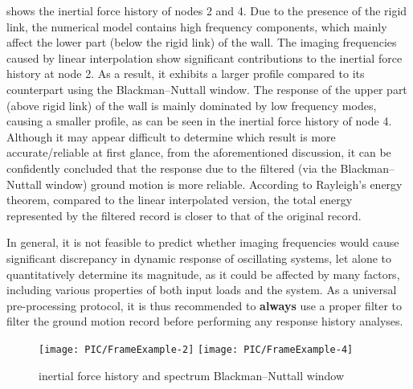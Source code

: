  shows the inertial force history of nodes 2 and 4. Due to the presence of the rigid link, the numerical model contains high frequency components, which mainly affect the lower part (below the rigid link) of the wall. The imaging frequencies caused by linear interpolation show significant contributions to the inertial force history at node 2. As a result, it exhibits a larger profile compared to its counterpart using the Blackman--Nuttall window. The response of the upper part (above rigid link) of the wall is mainly dominated by low frequency modes, causing a smaller profile, as can be seen in the inertial force history of node 4. Although it may appear difficult to determine which result is more accurate/reliable at first glance, from the aforementioned discussion, it can be confidently concluded that the response due to the filtered (via the Blackman--Nuttall window) ground motion is more reliable. According to Rayleigh’s energy theorem, compared to the linear interpolated version, the total energy represented by the filtered record is closer to that of the original record.

In general, it is not feasible to predict whether imaging frequencies would cause significant discrepancy in dynamic response of oscillating systems, let alone to quantitatively determine its magnitude, as it could be affected by many factors, including various properties of both input loads and the system. As a universal pre-processing protocol, it is thus recommended to \textbf{always} use a proper filter to filter the ground motion record before performing any response history analyses.
\begin{figure}[htb!]
\centering
\texttt{[image: PIC/FrameExample-2]}
\texttt{[image: PIC/FrameExample-4]}
\caption{inertial force history and spectrum Blackman--Nuttall window}\label{fig:practical_example}
\end{figure}